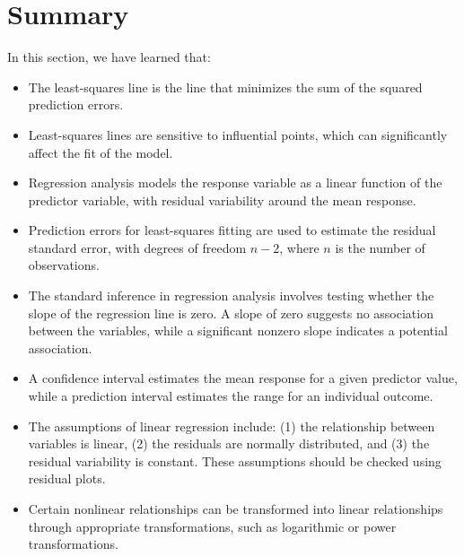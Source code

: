 \documentclass{article}
\begin{document}
\section*{Summary}

In this section, we have learned that:

\begin{itemize}
    \item The least-squares line is the line that minimizes the sum of the squared prediction errors.
    \item Least-squares lines are sensitive to influential points, which can significantly affect the fit of the model.
    \item Regression analysis models the response variable as a linear function of the predictor variable, with residual variability around the mean response.
    \item Prediction errors for least-squares fitting are used to estimate the residual standard error, with degrees of freedom \( n - 2 \), where \( n \) is the number of observations.
    \item The standard inference in regression analysis involves testing whether the slope of the regression line is zero. A slope of zero suggests no association between the variables, while a significant nonzero slope indicates a potential association.
    \item A confidence interval estimates the mean response for a given predictor value, while a prediction interval estimates the range for an individual outcome.
    \item The assumptions of linear regression include: (1) the relationship between variables is linear, (2) the residuals are normally distributed, and (3) the residual variability is constant. These assumptions should be checked using residual plots.
    \item Certain nonlinear relationships can be transformed into linear relationships through appropriate transformations, such as logarithmic or power transformations.
\end{itemize}
\end{document}
